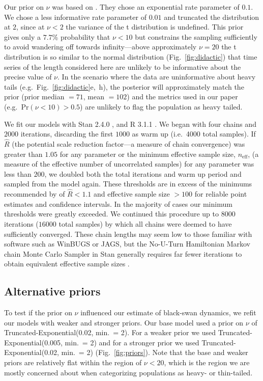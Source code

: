 Our prior on $\nu$ was based on \citet{fernandez1998}. They chose an
exponential rate parameter of $0.1$. We chose a less informative rate
parameter of $0.01$ and truncated the distribution at $2$, since at $\nu < 2$
the variance of the t distribution is undefined. This prior gives only a
$7.7$\% probability that $\nu < 10$ but constrains the sampling sufficiently
to avoid wandering off towards infinity---above approximately $\nu = 20$ the t
distribution is so similar to the normal distribution
(Fig.~\ref{fig:didactic}) that time series of the length considered here are
unlikely to be informative about the precise value of $\nu$. In the scenario
where the data are uninformative about heavy tails
(e.g.~Fig.~\ref{fig:didactic}e,~h), the posterior will approximately match the
prior (prior median $= 71$, mean $= 102$) and the metrics used in our paper
(e.g.~Pr$(\nu < 10) > 0.5$) are unlikely to flag the population as heavy
tailed.

We fit our models with Stan 2.4.0 \citep{stan-manual2014}, and R 3.1.1
\citep{r2014}. We began with four chains and $2000$ iterations, discarding the
first $1000$ as warm up (i.e.~4000 total samples). If $\hat{R}$ (the potential
scale reduction factor---a measure of chain convergence) was greater than
$1.05$ for any parameter or the minimum effective sample size,
$n_\mathrm{eff}$, (a measure of the effective number of uncorrelated samples)
for any parameter was less than $200$, we doubled both the total iterations
and warm up period and sampled from the model again. These thresholds are in
excess of the minimums recommended by \citet{gelman2006a} of $\hat{R} < 1.1$
and effective sample size $> 100$ for reliable point estimates and confidence
intervals. In the majority of cases our minimum thresholds were greatly
exceeded. We continued this procedure up to $8000$ iterations ($16000$ total
samples) by which all chains were deemed to have sufficiently converged. These
chain lengths may seem low to those familiar with software such as WinBUGS or
JAGS, but the No-U-Turn Hamiltonian Markov chain Monte Carlo Sampler in Stan
generally requires far fewer iterations to obtain equivalent effective sample
sizes \citep{stan-manual2014}.

\subsection{Alternative priors}

To test if the prior on $\nu$ influenced our estimate of black-swan dynamics,
we refit our models with weaker and stronger priors. Our base model used a
prior on $\nu$ of Truncated-Exponential(0.02, min.\ = 2). For a weaker prior
we used Truncated-Exponential(0.005, min.\ = 2) and for a stronger prior we
used Truncated-Exponential(0.02, min.\ = 2) (Fig.~\ref{fig:priors}). Note that
the base and weaker priors are relatively flat within the region of $\nu <
20$, which is the region we are mostly concerned about when categorizing populations
as heavy- or thin-tailed.

